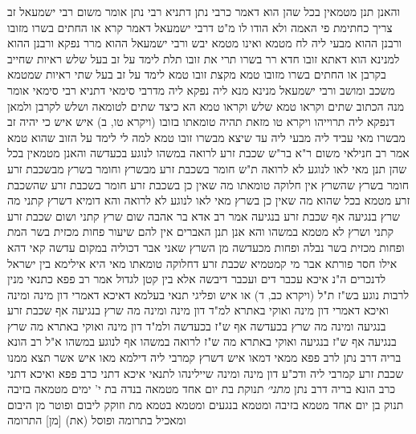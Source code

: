\documentclass[12pt, openany]{book}
\begin{document}
{והאנן תנן  מטמאין בכל שהן  הוא דאמר כרבי נתן  דתניא רבי נתן אומר משום רבי ישמעאל  זב צריך כחתימת פי האמה ולא הודו לו 
מ"ט דרבי ישמעאל  דאמר קרא או החתים בשרו מזובו 
ורבנן  ההוא מבעי ליה לח מטמא ואינו מטמא יבש 
ורבי ישמעאל  ההוא מרר נפקא 
ורבנן  ההוא למנינא הוא דאתא  זובו חדא רר בשרו תרי את זובו תלת לימד על זב בעל שלש ראיות שחייב בקרבן 
או החתים בשרו מזובו טמא מקצת זובו טמא לימד על זב בעל שתי ראיות שמטמא משכב ומושב  ורבי ישמעאל מנינא מנא ליה  נפקא ליה מדרבי סימאי
דתניא רבי סימאי אומר  מנה הכתוב שתים וקראו טמא שלש וקראו טמא  הא כיצד  שתים לטומאה ושלש לקרבן 
ולמאן דנפקא ליה תרוייהו {ויקרא טו } מזאת תהיה טומאתו בזובו (ויקרא טו, ב) איש איש כי יהיה זב מבשרו מאי עביד ליה  מבעי ליה עד שיצא מבשרו 
זובו טמא למה לי  לימד על הזוב שהוא טמא 
אמר רב חנילאי משום ר"א בר"ש  שכבת זרע לרואה במשהו לנוגע בכעדשה  והאנן מטמאין בכל שהן תנן  מאי לאו לנוגע  לא לרואה 
ת"ש  חומר בשכבת זרע מבשרץ וחומר בשרץ מבשכבת זרע  חומר בשרץ שהשרץ אין חלוקה טומאתו מה שאין כן בשכבת זרע  חומר בשכבת זרע שהשכבת זרע מטמא בכל שהוא מה שאין כן בשרץ 
מאי לאו לנוגע   לא לרואה 
והא דומיא דשרץ קתני מה שרץ בנגיעה אף שכבת זרע בנגיעה  אמר רב אדא בר אהבה  שום שרץ קתני ושום שכבת זרע קתני 
ושרץ לא מטמא במשהו  והא אנן תנן  האברים אין להם שיעור  פחות מכזית בשר המת ופחות מכזית בשר נבלה ופחות מכעדשה מן השרץ 
שאני אבר דכוליה במקום עדשה קאי דהא אילו חסר פורתא אבר מי קמטמיא 
שכבת זרע דחלוקה טומאתו מאי היא  אילימא בין ישראל לדנכרים ה"נ איכא עכבר דים ועכבר דיבשה 
אלא בין קטן לגדול 
אמר רב פפא  כתנאי מנין לרבות נוגע בש"ז ת"ל (ויקרא כב, ד) או איש 
ופליגי תנאי בעלמא דאיכא דאמרי דון מינה ומינה ואיכא דאמרי דון מינה ואוקי באתרא 
למ"ד דון מינה ומינה  מה שרץ בנגיעה אף שכבת זרע בנגיעה  ומינה מה שרץ בכעדשה אף ש"ז בכעדשה 
ולמ"ד דון מינה ואוקי באתרא  מה שרץ בנגיעה אף ש"ז בנגיעה  ואוקי באתרא  מה ש"ז לרואה במשהו אף לנוגע במשהו 
א"ל רב הונא בריה דרב נתן לרב פפא  ממאי דמאו איש דשרץ קמרבי ליה דילמא מאו איש אשר תצא ממנו שכבת זרע קמרבי ליה  ודכ"ע דון מינה ומינה 
שיילינהו לתנאי איכא דתני כרב פפא ואיכא דתני כרב הונא בריה דרב נתן
{\large\emph{מתני׳}} תנוקת בת יום אחד מטמאה בנדה בת י' ימים מטמאה בזיבה
תנוק בן יום אחד מטמא בזיבה ומטמא בנגעים ומטמא בטמא מת וזוקק ליבום ופוטר מן היבום ומאכיל בתרומה ופוסל (את) [מן] התרומה}
\end{document}
